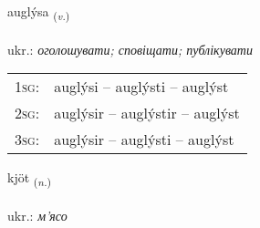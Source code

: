 \documentclass[frontgrid, backgrid]{flacards}\usepackage[]{graphicx}\usepackage[]{xcolor}
\begin{document}
\renewcommand{\flhead}{\vskip5pt \fboxsep=0pt {\small\bfseries\footnotesize Sagnorð | дієслово}}
\renewcommand{\fcfoot}{\vskip5pt \fboxsep=0pt \hspace{2pt}{\small\bfseries\footnotesize 2K}}

\renewcommand{\blhead}{\vskip5pt {\small\bfseries\footnotesize Sagnorð | дієслово }}
\renewcommand{\bcfoot}{\vskip5pt \hspace{2pt}{\small\bfseries\footnotesize 2K}}


{auglýsa \small{\textsubscript{(\textit{v.})}} \\[1ex] %
\textphonetic{[œiɣlisa]} \\
ukr.: \emph{оголошувати; сповіщати; публікувати} \\  [2ex]
\renewcommand*{\arraystretch}{0.8}
\begin{tabular}{p{1cm}l}
\textsc{1sg}: & auglýsi -- auglýsti -- auglýst \\ 
\textsc{2sg}: & auglýsir -- auglýstir -- auglýst \\ 
\textsc{3sg}: & auglýsir -- auglýsti -- auglýst \\ 
\end{tabular}
}

\renewcommand{\flhead}{\vskip5pt \fboxsep=0pt {\small\bfseries\footnotesize Nafnorð | іменник}}
\renewcommand{\fcfoot}{\vskip5pt \fboxsep=0pt \hspace{2pt}{\small\bfseries\footnotesize 2K}}

\renewcommand{\blhead}{\vskip5pt {\small\bfseries\footnotesize Nafnorð | іменник }}
\renewcommand{\bcfoot}{\vskip5pt \hspace{2pt}{\small\bfseries\footnotesize 2K}}


{kjöt \small{\textsubscript{(\textit{n.})}} \\[1ex] %
\textphonetic{[cʰœːt]} \\
ukr.: \emph{м'ясо} \\  [2ex]
\renewcommand*{\arraystretch}{0.8}
}
\end{document}
